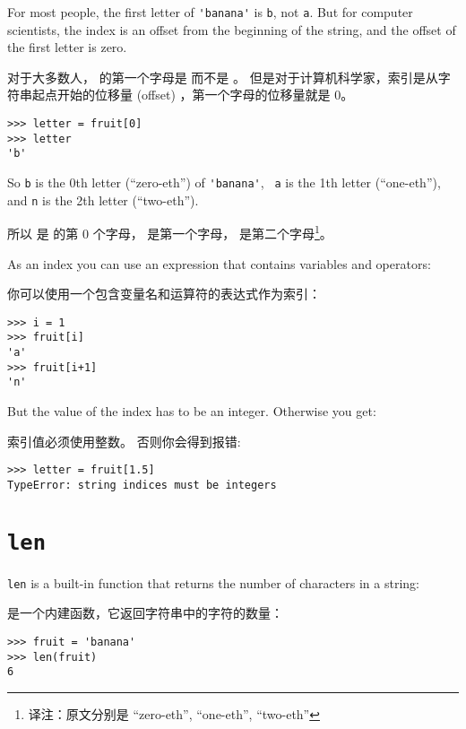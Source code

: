 %
For most people, the first letter of \verb"'banana'" is {\tt b}, not
{\tt a}.  But for computer scientists, the index is an offset from the
beginning of the string, and the offset of the first letter is zero.

对于大多数人， 的第一个字母是  而不是 。
但是对于计算机科学家，索引是从字符串起点开始的位移量 (offset) ，第一个字母的位移量就是 0。

\begin{lstlisting}
>>> letter = fruit[0]
>>> letter
'b'
\end{lstlisting}

%
So {\tt b} is the 0th letter (``zero-eth'') of \verb"'banana'", {\tt
  a} is the 1th letter (``one-eth''), and {\tt n} is the 2th letter
(``two-eth'').   

所以  是  的第 $0$ 个字母，  是第一个字母，  是第二个字母\footnote{译注：原文分别是 ``zero-eth'', ``one-eth'', ``two-eth''}。

As an index you can use an expression that contains variables and
operators:

你可以使用一个包含变量名和运算符的表达式作为索引：

\begin{lstlisting}
>>> i = 1
>>> fruit[i]
'a'
>>> fruit[i+1]
'n'
\end{lstlisting}

%

But the value of the index has to be an integer.  Otherwise you
get:
  

索引值必须使用整数。 否则你会得到报错:

\begin{lstlisting}
>>> letter = fruit[1.5]
TypeError: string indices must be integers
\end{lstlisting}


%
\section{{\tt len}}
  

{\tt len} is a built-in function that returns the number of characters
in a string:

 是一个内建函数，它返回字符串中的字符的数量：

\begin{lstlisting}
>>> fruit = 'banana'
>>> len(fruit)
6
\end{lstlisting}


